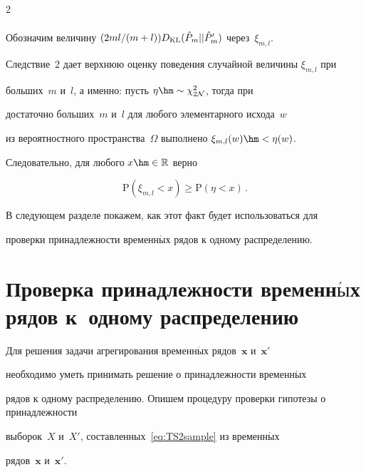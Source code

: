 \begin{multicols}{2}
\begin{multline*}
\end{multline*}





\smallskip



Обозначим величину $(2ml/(m+l))D_{\mathrm{KL}}(\hat{P}_m||\hat{P}'_m)$ через~$\xi_{m,l}$.

Следствие~2 дает верхнюю оценку поведения случайной величины $\xi_{m,l}$ при

больших~$m$ и~$l$, а именно: пусть $\eta\hm\sim \chi_{2\mathcal{N}}^2$, тогда при

достаточно больших~$m$ и~$l$ для любого элементарного исхода~$w$

из вероятностного пространства~$\Omega$ выполнено  $\xi_{m,l}(w) \hm< \eta(w)$.

Следовательно, для любого $x\hm\in\mathbb{R}$ верно

\begin{equation}

\label{eq:KLchi}

\mathrm{P}(\xi_{m,l} < x) \geq \mathrm{P}(\eta < x)\,.

\end{equation}

В следующем разделе покажем, как этот факт будет использоваться для

проверки принадлежности временн$\acute{\mbox{ы}}$х рядов к одному распределению.









\section{Проверка принадлежности временн$\acute{\mbox{ы}}$х рядов к~одному распределению}



Для решения задачи агрегирования временн$\acute{\mbox{ы}}$х рядов~$\mathbf{x}$ и~$\mathbf{x}'$

необходимо уметь принимать решение о принадлежности временн$\acute{\mbox{ы}}$х

рядов к одному распределению. Опишем процедуру проверки гипотезы о принадлежности

выборок~$X$ и~$X'$, составленных~\eqref{eq:TS2sample} из временн$\acute{\mbox{ы}}$х

рядов~$\mathbf{x}$ и~$\mathbf{x}'$.


\end{multicols}
